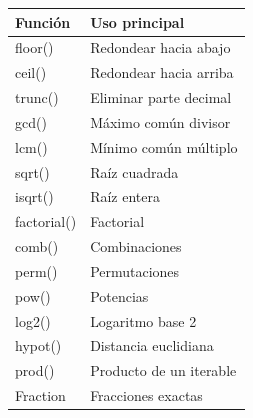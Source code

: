 \begin{center}
\begin{tabular}{|l|l|}
\hline
Función & Uso principal \\ \hline
floor() & Redondear hacia abajo \\ \hline
ceil() & Redondear hacia arriba \\ \hline
trunc() & Eliminar parte decimal \\ \hline
gcd() & Máximo común divisor \\ \hline
lcm() & Mínimo común múltiplo \\ \hline
sqrt() & Raíz cuadrada \\ \hline
isqrt() & Raíz entera \\ \hline
factorial() & Factorial \\ \hline
comb() & Combinaciones \\ \hline
perm() & Permutaciones \\ \hline
pow() & Potencias \\ \hline
log2() & Logaritmo base 2 \\ \hline
hypot() & Distancia euclidiana \\ \hline
prod() & Producto de un iterable \\ \hline
Fraction & Fracciones exactas \\ \hline
\end{tabular}
\end{center}
